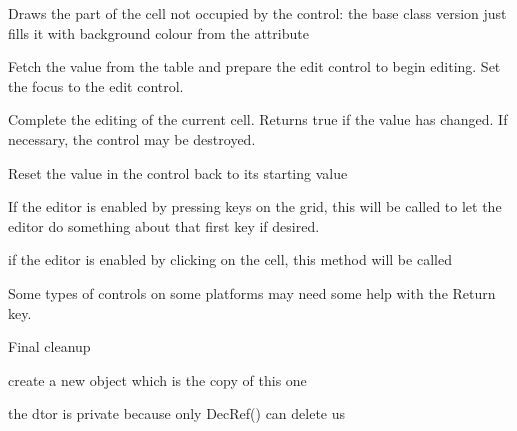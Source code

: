 Draws the part of the cell not occupied by the control: the base class
version just fills it with background colour from the attribute


\label{wxgridcelleditorbeginedit}


Fetch the value from the table and prepare the edit control
to begin editing.  Set the focus to the edit control.


\label{wxgridcelleditorendedit}


Complete the editing of the current cell. Returns true if the value has
changed.  If necessary, the control may be destroyed.


\label{wxgridcelleditorreset}


Reset the value in the control back to its starting value


\label{wxgridcelleditorstartingkey}


If the editor is enabled by pressing keys on the grid,
this will be called to let the editor do something about
that first key if desired.


\label{wxgridcelleditorstartingclick}


if the editor is enabled by clicking on the cell, this method will be
called


\label{wxgridcelleditorhandlereturn}


Some types of controls on some platforms may need some help
with the Return key.


\label{wxgridcelleditordestroy}


Final cleanup


\label{wxgridcelleditorclone}


create a new object which is the copy of this one


\label{wxgridcelleditordtor}


the dtor is private because only DecRef() can delete us

